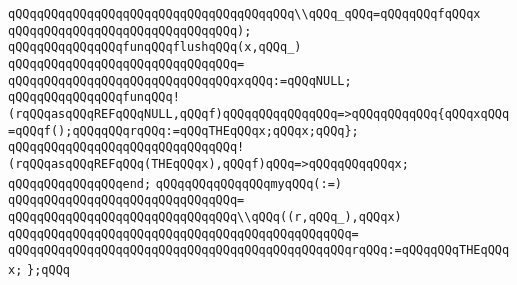 \verb|qQQqqQQqqQQqqQQqqQQqqQQqqQQqqQQqqQQqqQQq\\qQQq_qQQq=qQQqqQQqfqQQqx|\newline
\verb|qQQqqQQqqQQqqQQqqQQqqQQqqQQqqQQq);|\newline
\newline
\newline
\verb|qQQqqQQqqQQqqQQqfunqQQqflushqQQq(x,qQQq_)|\newline
\verb|qQQqqQQqqQQqqQQqqQQqqQQqqQQqqQQq=|\newline
\verb|qQQqqQQqqQQqqQQqqQQqqQQqqQQqqQQqxqQQq:=qQQqNULL;|\newline
\newline
\newline
\verb|qQQqqQQqqQQqqQQqfunqQQq!(rqQQqasqQQqREFqQQqNULL,qQQqf)qQQqqQQqqQQqqQQq=>qQQqqQQqqQQq{qQQqxqQQq=qQQqf();qQQqqQQqrqQQq:=qQQqTHEqQQqx;qQQqx;qQQq};|\newline
\verb|qQQqqQQqqQQqqQQqqQQqqQQqqQQqqQQq!(rqQQqasqQQqREFqQQq(THEqQQqx),qQQqf)qQQq=>qQQqqQQqqQQqx;|\newline
\verb|qQQqqQQqqQQqqQQqend;|\newline
\newline
\newline
\verb|qQQqqQQqqQQqqQQqmyqQQq(:=)|\newline
\verb|qQQqqQQqqQQqqQQqqQQqqQQqqQQqqQQq=|\newline
\verb|qQQqqQQqqQQqqQQqqQQqqQQqqQQqqQQq\\qQQq((r,qQQq_),qQQqx)|\newline
\verb|qQQqqQQqqQQqqQQqqQQqqQQqqQQqqQQqqQQqqQQqqQQqqQQq=|\newline
\verb|qQQqqQQqqQQqqQQqqQQqqQQqqQQqqQQqqQQqqQQqqQQqqQQqrqQQq:=qQQqqQQqTHEqQQqx;|\newline
\newline
\verb|};qQQq|\newline
\newline

